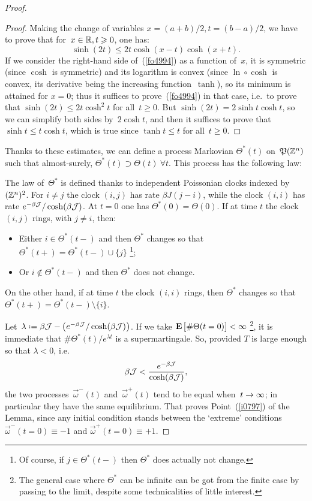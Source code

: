 \begin{proof}
%
\begin{proof}
Making the change of variables $x = (a+b)/2, t = (b-a)/2$,
we have to prove that for~${x \in \mathbb{R}}, \allowbreak t \geqslant 0$, one has:
\[\label{fo4994} \sinh(2t) \leq 2 t \cosh(x-t)\cosh(x+t) .\]
%
If we consider the right-hand side of~(\ref{fo4994})
as a function of~$x$, it is symmetric (since $\cosh$ is symmetric)
and its logarithm is convex (since $\ln\circ\cosh$ is convex,
its derivative being the increasing function~$\tanh$),
so its minimum is attained for $x=0$;
thus it suffices to prove~(\ref{fo4994}) in that case,
i.e.\ to prove that $\sinh(2t) \leq 2t\cosh^2t$ for all~$t\geq 0$.
But $\sinh(2t) = 2\sinh t\cosh t$, so we can simplify both sides by~$2\cosh t$,
and then it suffices to prove that
$\sinh t \leq t \cosh t$, which is true since
$\tanh t \leq t$ for all~$t\geq 0$.
\end{proof}

Thanks to these estimates, we can define a process Markovian $\Theta^*(t)$ on~$\mathfrak{P}(\mathbb{Z}^n)$
such that almost-surely, $\Theta^*(t) \supset \Theta(t)\ \forall t$.
This process has the following law:
%
\begin{Def}
The law of~$\Theta^*$ is defined thanks to independent Poissonian clocks
indexed by~$(\mathbb{Z}^n)^2$.
For $i\neq j$ the clock $(i,j)$ has rate $\beta J(j-i)$,
while the clock $(i,i)$ has rate $e^{-\beta\mathcal{J}} / \cosh(\beta\mathcal{J})$.
At $t=0$ one has $\Theta^*(0) = \Theta(0)$.
If at time $t$ the clock $(i,j)$ rings, with $j\neq i$, then:
%
\begin{itemize}
\item Either $i\in\Theta^*(t-)$ and then $\Theta^*$ changes so that
$\Theta^*(t+) = \Theta^*(t-) \cup \{j\}$%
\footnote{Of course, if $j\in\Theta^*(t-)$ then $\Theta^*$ does actually not change.};
\item Or $i\notin\Theta^*(t-)$ and then $\Theta^*$ does not change.
\end{itemize}
On the other hand, if at time $t$ the clock $(i,i)$ rings,
then $\Theta^*$ changes so that $\Theta^*(t+) = \Theta^*(t-) \setminus \{i\}$.
\end{Def}

Let~$\lambda \coloneqq \beta\mcal{J} - \big(e^{-\beta\mcal{J}}/\cosh(\beta\mcal{J})\big)$.
If we take $\EE\big[\#\Theta(t=0)\big] < \infty$%
\footnote{The general case where $\Theta^*$ can be infinite can be got
from the finite case by passing to the limit,
despite some technicalities of little interest.},
it is immediate that $\#\Theta^*(t)/e^{\lambda t}$ is a supermartingale.
So, provided $T$ is large enough so that $\lambda < 0$, i.e.
\[\label{for5229} \beta\mathcal{J} < \frac{e^{-\beta\mathcal{J}}}{\cosh(\beta\mathcal{J})} ,\]
the two processes~$\vec{\omega}^-(t)$ and~$\vec{\omega}^+(t)$
tend to be equal when~$t\to\infty$; in particular they have the same equilibrium.
That proves Point~(\ref{i0797}) of the Lemma,
since any initial condition stands between the `extreme' conditions
$\vec\omega^-(t=0) \equiv -1$ and $\vec\omega^+(t=0) \equiv +1$.


\end{proof}
